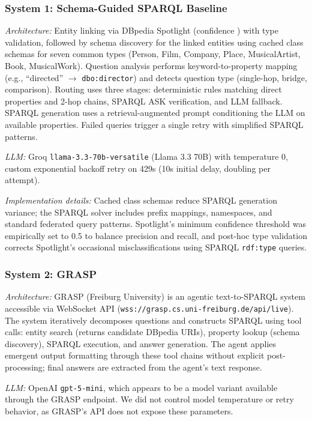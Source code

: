 \subsubsection{System 1: Schema-Guided SPARQL Baseline}

\textit{Architecture:} Entity linking via DBpedia Spotlight (confidence ) with type validation, followed by schema discovery for the linked entities using cached class schemas for seven common types (Person, Film, Company, Place, MusicalArtist, Book, MusicalWork). Question analysis performs keyword-to-property mapping (e.g., ``directed'' $\to$ \texttt{dbo:director}) and detects question type (single-hop, bridge, comparison). Routing uses three stages: deterministic rules matching direct properties and 2-hop chains, SPARQL ASK verification, and LLM fallback. SPARQL generation uses a retrieval-augmented prompt conditioning the LLM on available properties. Failed queries trigger a single retry with simplified SPARQL patterns.

\textit{LLM:} Groq \texttt{llama-3.3-70b-versatile} (Llama 3.3 70B) with temperature 0, custom exponential backoff retry on 429s (10s initial delay, doubling per attempt).

\textit{Implementation details:} Cached class schemas reduce SPARQL generation variance; the SPARQL solver includes prefix mappings, namespaces, and standard federated query patterns. Spotlight's minimum confidence threshold was empirically set to 0.5 to balance precision and recall, and post-hoc type validation corrects Spotlight's occasional misclassifications using SPARQL \texttt{rdf:type} queries.

\subsubsection{System 2: GRASP}

\textit{Architecture:} GRASP (Freiburg University) is an agentic text-to-SPARQL system accessible via WebSocket API (\texttt{wss://grasp.cs.uni-freiburg.de/api/live}). The system iteratively decomposes questions and constructs SPARQL using tool calls: entity search (returns candidate DBpedia URIs), property lookup (schema discovery), SPARQL execution, and answer generation. The agent applies emergent output formatting through these tool chains without explicit post-processing; final answers are extracted from the agent's text response.

\textit{LLM:} OpenAI \texttt{gpt-5-mini}, which appears to be a model variant available through the GRASP endpoint. We did not control model temperature or retry behavior, as GRASP's API does not expose these parameters.

